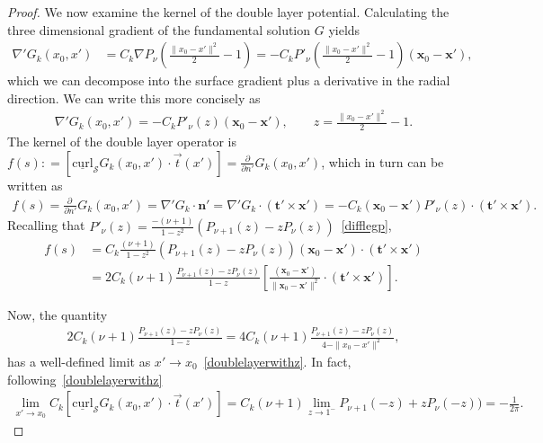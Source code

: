 \documentclass[final]{siamltex}
\newcommand{\C}{C_k}
\renewcommand{\S} {\mathcal{S}}
\begin{document}
\begin{proof}
We now examine the kernel of the double layer potential. Calculating the
three dimensional gradient of the fundamental solution $G$ yields
\begin{align*}
  \nabla' G_k(x_0,x') &= \C \nabla P_\nu\left(
    \frac{\|x_0-x'\|^2}{2}-1\right) = 
  -\C P'_\nu\left(\frac{\|x_0-x'\|^2}{2}-1\right)
    (\mathbf{x}_{0}-\mathbf{x'}),
\end{align*}
which we can decompose into the surface gradient plus a derivative in
the radial direction. We can write this more concisely as
\begin{align*}
\nabla' G_k(x_0,x')=-\C P'_{\nu}(z) (\mathbf{x}_0-\mathbf{x'}), \qquad 
  z=\frac{\|{ x_0}-{x}'\|^2}{2}-1.
\end{align*} 
The kernel of the double layer operator is $f(s): =
[\underline{\mbox{curl}}_{\S}G_{k}(x_{0},x') \cdot \vec{t}(x')]=
\frac{\partial}{\partial n'} G_k({x}_{0},{x}')$, which in turn can be
written as 
\begin{align*}
 f(s)=\frac{\partial \, }{\partial n'} G_{k}(x_{0},x') 
 =\nabla' G_{k} \cdot \mathbf{n'} = \nabla' G_k\cdot \left( \mathbf{t'}
 \times \mathbf{x'} \right) 
 =-\C (\mathbf{x}_0-\mathbf{x'})P'_{\nu}(z)\cdot \left(
 \mathbf{t'} \times \mathbf{x'} \right).
\end{align*}
Recalling that $P'_{\nu}(z)=\frac{-(\nu+1)}{1-z^2}(P_{\nu+1}(z)-z
P_{\nu}(z))$~\eqref{difflegp},
\begin{align}
  f(s) &= \C \frac{(\nu+1)}{1-z^2}\left(
  P_{\nu+1}(z)-zP_{\nu}(z)\right) 
  (\mathbf{x}_0-\mathbf{x'})\cdot \left(
  \mathbf{t}' \times {\mathbf x}' \right) \nonumber\\
  &= 2\C(\nu+1)\frac{P_{\nu+1}(z)-zP_{\nu}(z)}{1-z} \left[
  \frac{(\mathbf{x}_0-\mathbf{x'})}{\|\mathbf{x}_{0}-\mathbf{x'}\|^2}
  \cdot \left( \mathbf{t}' \times \mathbf{x'} \right)\right].
  \label{kern1}
\end{align} 

Now, the quantity
\begin{align*}
  2\C(\nu+1)\frac{P_{\nu+1}(z)-zP_{\nu}(z)}{1-z}
  =4\C(\nu+1)\frac{P_{\nu+1}(z)-zP_{\nu}(z)}{4-\|{x_0}-{x'}\|^2},
\end{align*}
has a well-defined limit as $x' \rightarrow
x_{0}$~\eqref{doublelayerwithz}. In fact,
following~\eqref{doublelayerwithz}
\begin{align*}
  \lim_{x'\rightarrow x_0} 
  \C[\underline{\mbox{curl}}_{\S}G_{k}(x_{0},x') \cdot \vec{t}(x')] 
  = \C(\nu+1)\lim_{z\rightarrow 1^-}
  P_{\nu+1}(-z)+zP_{\nu}(-z)) = -\frac{1}{2\pi}.
\end{align*}


\end{proof}
\end{document}

